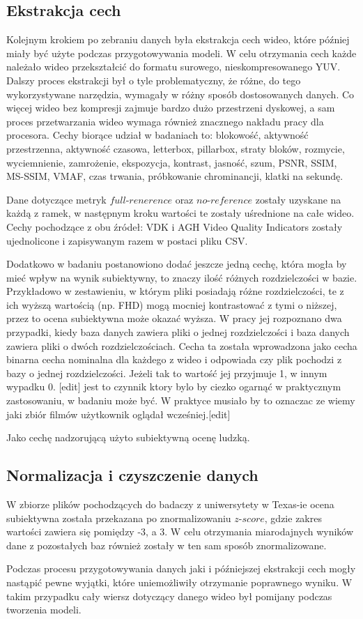 \subsection{Ekstrakcja cech}
Kolejnym krokiem po zebraniu danych była ekstrakcja cech wideo, które później miały być użyte podczas przygotowywania modeli. W celu otrzymania cech każde należało wideo przekształcić do formatu surowego, nieskompresowanego YUV. Dalszy proces ekstrakcji był o tyle problematyczny, że różne, do tego wykorzystywane narzędzia, wymagały w różny sposób dostosowanych danych. Co więcej wideo bez kompresji zajmuje bardzo dużo przestrzeni dyskowej, a sam proces przetwarzania wideo wymaga również znacznego nakładu pracy dla procesora. Cechy biorące udział w badaniach to: blokowość, aktywność przestrzenna, aktywność czasowa, letterbox, pillarbox, straty bloków, rozmycie, wyciemnienie, zamrożenie, ekspozycja, kontrast, jasność, szum, PSNR, SSIM, MS-SSIM, VMAF, czas trwania, próbkowanie chrominancji, klatki na sekundę.\par
Dane dotyczące metryk $full$-$renerence$ oraz $no$-$reference$ zostały uzyskane na każdą z ramek, w następnym kroku wartości te zostały uśrednione na całe wideo. Cechy pochodzące z obu źródeł: VDK i AGH Video Quality Indicators zostały ujednolicone i zapisywanym razem w postaci pliku CSV.\par
Dodatkowo w badaniu postanowiono dodać jeszcze jedną cechę, która mogła by mieć wpływ na wynik subiektywny, to znaczy ilość różnych rozdzielczości w bazie. Przykładowo w zestawieniu, w którym pliki posiadają różne rozdzielczości, te z ich wyższą wartością (np. FHD) mogą mocniej kontrastować z tymi o niższej, przez to ocena subiektywna może okazać wyższa. W pracy jej rozpoznano dwa przypadki, kiedy baza danych zawiera pliki o jednej rozdzielczości i baza danych zawiera pliki o dwóch rozdzielczościach. Cecha ta została wprowadzona jako cecha binarna cecha nominalna dla każdego z wideo i odpowiada czy plik pochodzi z bazy o jednej rozdzielczości. Jeżeli tak to wartość jej przyjmuje 1, w innym wypadku 0. [edit] jest to czynnik ktory bylo by ciezko ogarnąć w praktycznym zastosowaniu, w badaniu może być. W praktyce musiało by to oznaczac ze wiemy jaki zbiór filmów użytkownik oglądał wcześniej.[edit] \par
Jako cechę nadzorującą użyto subiektywną ocenę ludzką.\par

\subsection{Normalizacja i czyszczenie danych}
W zbiorze plików pochodzących do badaczy z uniwersytety w Texas-ie ocena subiektywna została przekazana po znormalizowaniu $z$-$score$, gdzie zakres wartości zawiera się pomiędzy -3, a 3. W celu otrzymania miarodajnych wyników dane z pozostałych baz również zostały w ten sam sposób znormalizowane.\par
Podczas procesu przygotowywania danych jaki i późniejszej ekstrakcji cech mogły nastąpić pewne wyjątki, które uniemożliwiły otrzymanie poprawnego wyniku. W takim przypadku cały wiersz dotyczący danego wideo był pomijany podczas tworzenia modeli.

